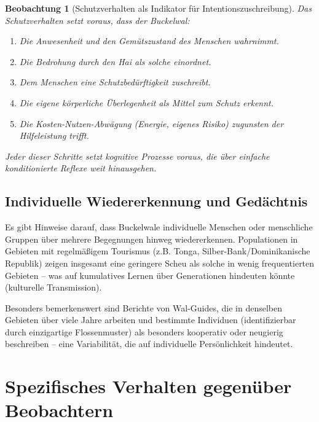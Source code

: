 ﻿\documentclass[12pt,a4paper]{article}
\newtheorem{beobachtung}{Beobachtung}[section]
\theoremstyle{definition}
\theoremstyle{remark}
\begin{document}
\begin{beobachtung}[Schutzverhalten als Indikator für Intentionszuschreibung]
  Das Schutzverhalten setzt voraus, dass der Buckelwal:
  \begin{enumerate}
    \item Die Anwesenheit und den Gemütszustand des Menschen wahrnimmt.
    \item Die Bedrohung durch den Hai als solche einordnet.
    \item Dem Menschen eine Schutzbedürftigkeit zuschreibt.
    \item Die eigene körperliche Überlegenheit als Mittel zum Schutz erkennt.
    \item Die Kosten-Nutzen-Abwägung (Energie, eigenes Risiko) zugunsten
          der Hilfeleistung trifft.
  \end{enumerate}
  Jeder dieser Schritte setzt kognitive Prozesse voraus, die über einfache
  konditionierte Reflexe weit hinausgehen.
\end{beobachtung}

\subsection{Individuelle Wiedererkennung und Gedächtnis}

Es gibt Hinweise darauf, dass Buckelwale individuelle Menschen oder menschliche
Gruppen über mehrere Begegnungen hinweg wiedererkennen. Populationen in
Gebieten mit regelmäßigem Tourismus (z.B. Tonga, Silber-Bank/Dominikanische
Republik) zeigen insgesamt eine geringere Scheu als solche in wenig frequentierten
Gebieten -- was auf kumulatives Lernen über Generationen hindeuten könnte
(kulturelle Transmission).

Besonders bemerkenswert sind Berichte von Wal-Guides, die in denselben
Gebieten über viele Jahre arbeiten und bestimmte Individuen (identifizierbar
durch einzigartige Flossenmuster) als besonders kooperativ oder neugierig
beschreiben -- eine Variabilität, die auf individuelle Persönlichkeit hindeutet.

\section{Spezifisches Verhalten gegenüber Beobachtern}
\label{sec:kamera}
\end{document}
